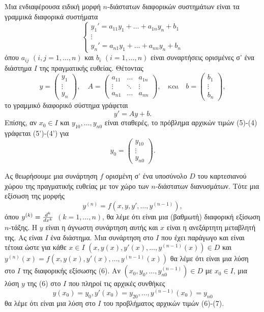 \documentclass[a4paper,twoside,11pt]{book}
\DeclareRobustCommand{\frac}[3][0pt]{%
{\begingroup\hspace{#1}#2\hspace{#1}\endgroup\over\hspace{#1}#3\hspace{#1}}}
\begin{document}
Μια ενδιαφέρουσα ειδική μορφή $n$-διάστατων διαφορικών συστημάτων είναι τα γραμμικά διαφορικά συστήματα
\begin{equation}
    \begin{cases}
        y_1' = a_{11}y_1 + \dots + a_{1n}y_n + b_1 \\
        \vdots \\
        y_n' = a_{n1}y_1 + \dots + a_{nn}y_n + b_n
    \end{cases}
\end{equation}
όπου $a_{ij}$ $(i,j=1,\dots,n)$ και $b_i$ $(i=1,\dots,n)$ είναι συναρτήσεις ορισμένες σ' ένα διάστημα $I$ της πραγματικής ευθείας. Θέτοντας
\[
    y = \begin{pmatrix} y_1 \\ \vdots \\ y_n \end{pmatrix}, \quad A = \begin{pmatrix} a_{11} & \dots & a_{1n} \\ \vdots & \ddots & \vdots \\ a_{n1} & \dots & a_{nn} \end{pmatrix}, \quad \text{και} \quad b = \begin{pmatrix} b_1 \\ \vdots \\ b_n \end{pmatrix},
\]
το γραμμικό διαφορικό σύστημα γράφεται
\begin{equation*} \label{eq:5prime}
    y' = Ay+b. \tag{5'}
\end{equation*}
Επίσης, αν $x_0 \in I$ και $y_{10}, \dots, y_{n0}$ είναι σταθερές, το πρόβλημα αρχικών τιμών (5)-(4) γράφεται (5')-(4') για
\[
    y_0 = \begin{pmatrix} y_{10} \\ \vdots \\ y_{n0} \end{pmatrix}.
\]

Ας θεωρήσουμε μια συνάρτηση $f$ ορισμένη σ' ένα υποσύνολο $D$ του καρτεσιανού χώρου της πραγματικής ευθείας με τον χώρο των $n$-διάστατων διανυσμάτων. Τότε μια εξίσωση της μορφής
\begin{equation}
    y^{(n)} = f(x,y,y', \dots, y^{(n-1)}),
\end{equation}
όπου $y^{(k)} = \frac{d^k}{dx^k}$ $(k=1, \dots, n)$, θα λέμε ότι είναι μια (βαθμωτή) διαφορική εξίσωση $n$-τάξης. Η $y$ είναι η άγνωστη συνάρτηση αυτής και $x$ είναι η ανεξάρτητη μεταβλητή της. Ας είναι $I$ ένα διάστημα. Μια συνάρτηση στο $I$ που έχει παράγωγο και είναι τέτοια ώστε για κάθε $x \in I$
$(x, y(x), y'(x), \dots, y^{(n-1)}(x)) \in D$ και $y^{(n)}(x) = f(x, y(x), y'(x), \dots, y^{(n-1)}(x))$
θα λέμε ότι είναι μια λύση στο $I$ της διαφορικής εξίσωσης (6). Αν $(x_0, y_0, \dots, y_{n0}^{(n-1)}) \in D$ με $x_0 \in I$, μια λύση $y$ της (6) στο $I$ που πληροί τις αρχικές συνθήκες
\begin{equation}
    y(x_0)=y_0, y'(x_0)=y_{20}, \dots, y^{(n-1)}(x_0)=y_{n0}
\end{equation}
θα λέμε ότι είναι μια λύση στο $I$ του προβλήματος αρχικών τιμών (6)-(7).
\end{document}
